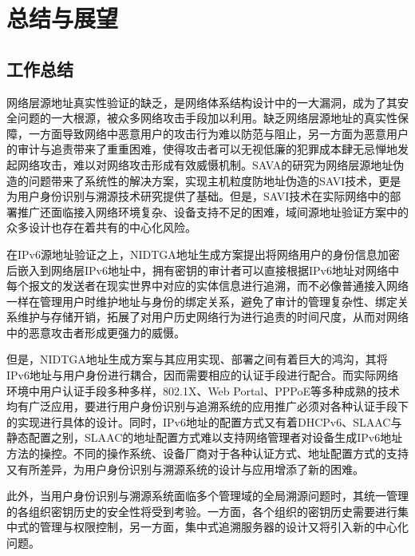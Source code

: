 
\chapter{总结与展望}
\label{future}

  \section{工作总结}
  \label{future:summary}
  网络层源地址真实性验证的缺乏，是网络体系结构设计中的一大漏洞，成为了其安全问题的一大根源，被众多网络攻击手段加以利用。缺乏网络层源地址的真实性保障，一方面导致网络中恶意用户的攻击行为难以防范与阻止，另一方面为恶意用户的审计与追责带来了重重困难，使得攻击者可以无视低廉的犯罪成本肆无忌惮地发起网络攻击，难以对网络攻击形成有效威慑机制。SAVA的研究为网络层源地址伪造的问题带来了系统性的解决方案，实现主机粒度防地址伪造的SAVI技术，更是为用户身份识别与溯源技术研究提供了基础。但是，SAVI技术在实际网络中的部署推广还面临接入网络环境复杂、设备支持不足的困难，域间源地址验证方案中的众多设计也存在着共有的中心化风险。

  在IPv6源地址验证之上，NIDTGA地址生成方案提出将网络用户的身份信息加密后嵌入到网络层IPv6地址中，拥有密钥的审计者可以直接根据IPv6地址对网络中每个报文的发送者在现实世界中对应的实体信息进行追溯，而不必像普通接入网络一样在管理用户时维护地址与身份的绑定关系，避免了审计的管理复杂性、绑定关系维护与存储开销，拓展了对用户历史网络行为进行追责的时间尺度，从而对网络中的恶意攻击者形成更强力的威慑。

  但是，NIDTGA地址生成方案与其应用实现、部署之间有着巨大的鸿沟，其将IPv6地址与用户身份进行耦合，因而需要相应的认证手段进行配合。而实际网络环境中用户认证手段多种多样，802.1X、Web Portal、PPPoE等多种成熟的技术均有广泛应用，要进行用户身份识别与追溯系统的应用推广必须对各种认证手段下的实现进行具体的设计。同时，IPv6地址的配置方式又有着DHCPv6、SLAAC与静态配置之别，SLAAC的地址配置方式难以支持网络管理者对设备生成IPv6地址方法的操控。不同的操作系统、设备厂商对于各种认证方式、地址配置方式的支持又有所差异，为用户身份识别与溯源系统的设计与应用增添了新的困难。

  此外，当用户身份识别与溯源系统面临多个管理域的全局溯源问题时，其统一管理的各组织密钥历史的安全性将受到考验。一方面，各个组织的密钥历史需要进行集中式的管理与权限控制，另一方面，集中式追溯服务器的设计又将引入新的中心化问题。

